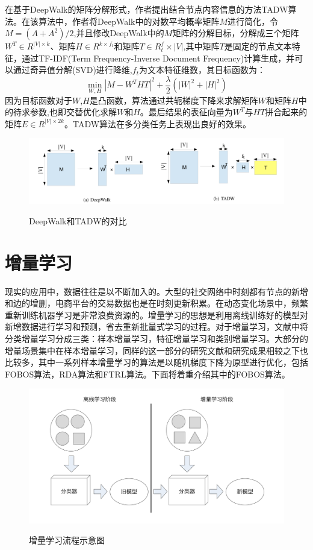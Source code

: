 在基于DeepWalk的矩阵分解形式，作者提出结合节点内容信息的方法TADW算法。在该算法中，作者将DeepWalk中的对数平均概率矩阵$M$进行简化，令$M = (A+A^2)/2$,并且修改DeepWalk中的$M$矩阵的分解目标，分解成三个矩阵$W^T \in R^{|V| \times k}$、矩阵$H \in R^{k\times f_t}$和矩阵$T\in R^f_t\times |V|$,其中矩阵$T$是固定的节点文本特征，通过TF-IDF(Term  Frequency-Inverse Document Frequency)计算生成，并可以通过奇异值分解(SVD)进行降维,$f_t$为文本特征维数，其目标函数为：
\begin{equation}
	\min_{W,H} |M-W^THT|^2 +\frac{\lambda}{2}(|W|^2+|H|^2)
\end{equation}
因为目标函数对于$W$,$H$是凸函数，算法通过共轭梯度下降来求解矩阵$W$和矩阵$H$中的待求参数,也即交替优化求解$W$和$H$。最后结果的表征向量为$W^T$与$HT$拼合起来的矩阵$E\in R^{|V|\times 2k}$。TADW算法在多分类任务上表现出良好的效果。
 \begin{figure}[!ht]
	\centering
	{\includegraphics[width=5in]{figures/tadw.png}}
	\caption{DeepWalk和TADW的对比}\label{tadw}
\end{figure}


\section{增量学习}
现实的应用中，数据往往是以不断加入的。大型的社交网络中时刻都有节点的新增和边的增删，电商平台的交易数据也是在时刻更新积累。在动态变化场景中，频繁重新训练机器学习是非常浪费资源的。增量学习的思想是利用离线训练好的模型对新增数据进行学习和预测，省去重新批量式学习的过程。对于增量学习，文献\cite{zhong2017survey}中将分类增量学习分成三类：样本增量学习，特征增量学习和类别增量学习。大部分的增量场景集中在样本增量学习，同样的这一部分的研究文献和研究成果相较之下也比较多，其中一系列样本增量学习的算法是以随机梯度下降为原型进行优化，包括FOBOS算法，RDA算法和FTRL算法。下面将着重介绍其中的FOBOS算法。
 \begin{figure}[!ht]
	\centering
	{\includegraphics[width=5in]{figures/incremental_struct.png}}
	\caption{增量学习流程示意图}
\end{figure}

